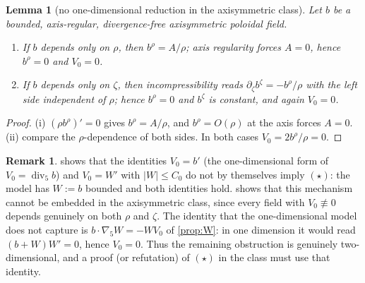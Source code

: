 \documentclass[11pt]{article}
\newtheorem{lemma}[theorem]{Lemma}
\theoremstyle{definition}
\newtheorem{remark}[theorem]{Remark}
\newcommand{\Div}{\operatorname{div}}
\begin{document}
\begin{lemma}[no one-dimensional reduction in the axisymmetric class]
\label{lem:no1d}
Let $b$ be a bounded, axis-regular, divergence-free axisymmetric poloidal
field.
\begin{enumerate}
\item If $b$ depends only on $\rho$, then $b^\rho=A/\rho$; axis regularity
forces $A=0$, hence $b^\rho=0$ and $V_0=0$.
\item If $b$ depends only on $\zeta$, then incompressibility reads
$\partial_\zeta b^\zeta=-b^\rho/\rho$ with the left side independent of
$\rho$; hence $b^\rho=0$ and $b^\zeta$ is constant, and again $V_0=0$.
\end{enumerate}
\end{lemma}
\begin{proof}
(i) $(\rho b^\rho)'=0$ gives $b^\rho=A/\rho$, and $b^\rho=O(\rho)$ at the axis
forces $A=0$. (ii) compare the $\rho$-dependence of both sides. In both cases
$V_0=2b^\rho/\rho=0$.
\end{proof}

\begin{remark}
 shows that the identities $V_0=b'$ (the one-dimensional form
of $V_0=\Div_5b$) and $V_0=W'$ with $|W|\le C_0$ do not by themselves imply
$(\star)$: the model has $W:=b$ bounded and both identities hold. 
shows that this mechanism cannot be embedded in the axisymmetric class, since
every field with $V_0\not\equiv0$ depends genuinely on both $\rho$ and $\zeta$.
The identity that the one-dimensional model does not capture is
$b\cdot\nabla_5W=-WV_0$ of \cref{prop:W}: in one dimension it would read
$(b+W)W'=0$, hence $V_0=0$. Thus the remaining obstruction is genuinely
two-dimensional, and a proof (or refutation) of $(\star)$ in the class must use
that identity.
\end{remark}
\end{document}
